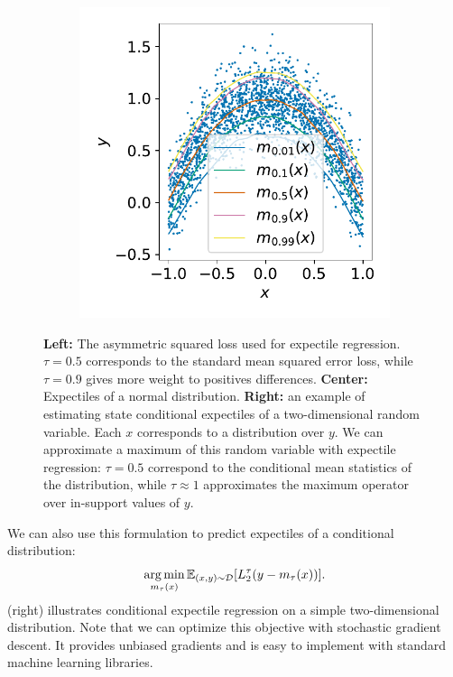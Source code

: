 \documentclass{article} %
\begin{document}
\begin{figure}
\begin{subfigure}[t]{0.32\textwidth}
\end{subfigure}
\begin{subfigure}[t]{0.32\textwidth}
    \centering
    \includegraphics[width=\textwidth]{images/expectile_regression.pdf}
\end{subfigure}
\caption{\textbf{Left:} The asymmetric squared loss used for expectile regression. $\tau=0.5$ corresponds to the standard mean squared error loss, while $\tau=0.9$ gives more weight to positives differences.
\textbf{Center:} Expectiles of a normal distribution.
    \textbf{Right:} an example of estimating state conditional expectiles of a two-dimensional random variable. Each $x$ corresponds to a distribution over $y$. We can approximate a maximum of this random variable with expectile regression: $\tau=0.5$ correspond to the conditional mean statistics of the distribution, while $\tau \approx 1$ approximates the maximum operator over in-support values of $y$.\label{fig:expectiles}}
\end{figure}



We can also use this formulation to predict expectiles of a conditional distribution:
$$\operatorname*{arg\,min}_{m_\tau(x)} \mathbb{E}_{(x,y)\sim \mathcal{D}}[L_2^\tau(y-m_\tau(x))].$$
 (right) illustrates conditional expectile regression on a simple two-dimensional distribution. Note that we can optimize this objective with stochastic gradient descent. It provides unbiased gradients and is easy to implement with standard machine learning libraries. 
\end{document}
